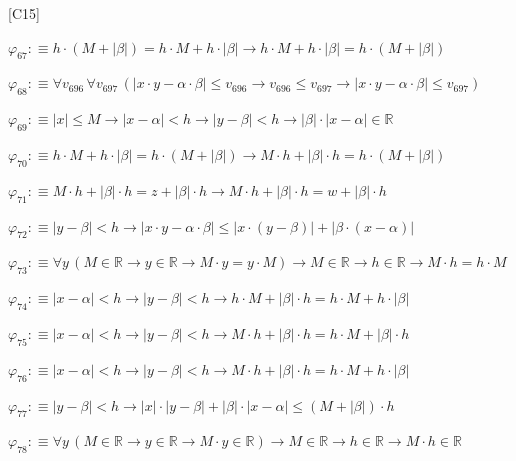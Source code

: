 \begin{fullproof}{[C15]}
\begin{abbrevlist}
\item $\varphi_{67} :\equiv h \cdot (M + \lvert \beta \rvert) = h \cdot M + h \cdot \lvert \beta \rvert \to h \cdot M + h \cdot \lvert \beta \rvert = h \cdot (M + \lvert \beta \rvert)$
\item $\varphi_{68} :\equiv \forall v_{696}\,\forall v_{697}\,(\lvert x \cdot y - \alpha \cdot \beta \rvert \leq v_{696} \to v_{696} \leq v_{697} \to \lvert x \cdot y - \alpha \cdot \beta \rvert \leq v_{697})$
\item $\varphi_{69} :\equiv \lvert x \rvert \leq M \to \lvert x - \alpha \rvert < h \to \lvert y - \beta \rvert < h \to \lvert \beta \rvert \cdot \lvert x - \alpha \rvert \in \mathbb{R}$
\item $\varphi_{70} :\equiv h \cdot M + h \cdot \lvert \beta \rvert = h \cdot (M + \lvert \beta \rvert) \to M \cdot h + \lvert \beta \rvert \cdot h = h \cdot (M + \lvert \beta \rvert)$
\item $\varphi_{71} :\equiv M \cdot h + \lvert \beta \rvert \cdot h = z + \lvert \beta \rvert \cdot h \to M \cdot h + \lvert \beta \rvert \cdot h = w + \lvert \beta \rvert \cdot h$
\item $\varphi_{72} :\equiv \lvert y - \beta \rvert < h \to \lvert x \cdot y - \alpha \cdot \beta \rvert \leq \lvert x \cdot (y - \beta) \rvert + \lvert \beta \cdot (x - \alpha) \rvert$
\item $\varphi_{73} :\equiv \forall y\,(M \in \mathbb{R} \to y \in \mathbb{R} \to M \cdot y = y \cdot M) \to M \in \mathbb{R} \to h \in \mathbb{R} \to M \cdot h = h \cdot M$
\item $\varphi_{74} :\equiv \lvert x - \alpha \rvert < h \to \lvert y - \beta \rvert < h \to h \cdot M + \lvert \beta \rvert \cdot h = h \cdot M + h \cdot \lvert \beta \rvert$
\item $\varphi_{75} :\equiv \lvert x - \alpha \rvert < h \to \lvert y - \beta \rvert < h \to M \cdot h + \lvert \beta \rvert \cdot h = h \cdot M + \lvert \beta \rvert \cdot h$
\item $\varphi_{76} :\equiv \lvert x - \alpha \rvert < h \to \lvert y - \beta \rvert < h \to M \cdot h + \lvert \beta \rvert \cdot h = h \cdot M + h \cdot \lvert \beta \rvert$
\item $\varphi_{77} :\equiv \lvert y - \beta \rvert < h \to \lvert x \rvert \cdot \lvert y - \beta \rvert + \lvert \beta \rvert \cdot \lvert x - \alpha \rvert \leq (M + \lvert \beta \rvert) \cdot h$
\item $\varphi_{78} :\equiv \forall y\,(M \in \mathbb{R} \to y \in \mathbb{R} \to M \cdot y \in \mathbb{R}) \to M \in \mathbb{R} \to h \in \mathbb{R} \to M \cdot h \in \mathbb{R}$

\end{abbrevlist}
\end{fullproof}
